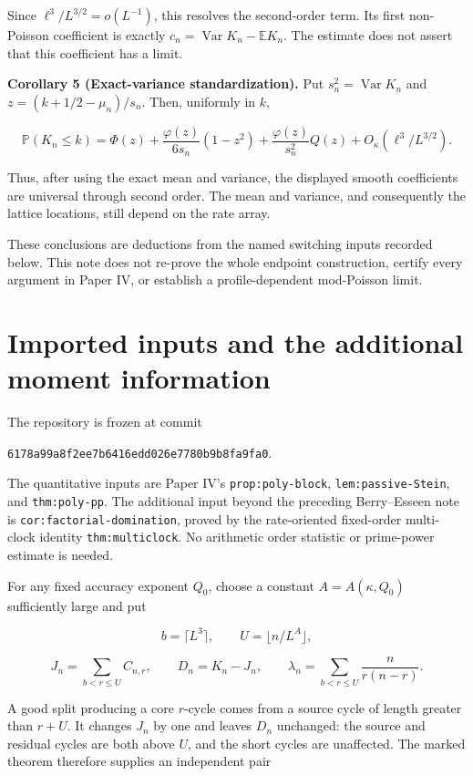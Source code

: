 \documentclass[
  11pt,
]{article}
\begin{document}
Since \(\ell^3/L^{3/2}=o(L^{-1})\), this resolves the second-order term.
Its first non-Poisson coefficient is exactly
\(c_n=\operatorname{Var}K_n-\mathbb E K_n\). The estimate does not
assert that this coefficient has a limit.


\textbf{Corollary 5 (Exact-variance standardization).} Put
\(s_n^2=\operatorname{Var}K_n\) and \(z=(k+1/2-\mu_n)/s_n\). Then,
uniformly in \(k\),

\[
\mathbb P(K_n\le k)
=\Phi(z)+\frac{\varphi(z)}{6s_n}(1-z^2)
+\frac{\varphi(z)}{s_n^2}Q(z)
+O_\kappa(\ell^3/L^{3/2}).
\tag{7}
\]

Thus, after using the exact mean and variance, the displayed smooth
coefficients are universal through second order. The mean and variance,
and consequently the lattice locations, still depend on the rate array.

These conclusions are deductions from the named switching inputs
recorded below. This note does not re-prove the whole endpoint
construction, certify every argument in Paper IV, or establish a
profile-dependent mod-Poisson limit.

\section{Imported inputs and the additional moment
information}\label{imported-inputs-and-the-additional-moment-information}

The repository is frozen at commit

\texttt{6178a99a8f2ee7b6416edd026e7780b9b8fa9fa0}.

The quantitative inputs are Paper IV's \texttt{prop:poly-block},
\texttt{lem:passive-Stein}, and \texttt{thm:poly-pp}. The additional
input beyond the preceding Berry--Esseen note is
\texttt{cor:factorial-domination}, proved by the rate-oriented
fixed-order multi-clock identity \texttt{thm:multiclock}. No arithmetic
order statistic or prime-power estimate is needed.

For any fixed accuracy exponent \(Q_0\), choose a constant
\(A=A(\kappa,Q_0)\) sufficiently large and put

\[
b=\lceil L^3\rceil,\qquad U=\lfloor n/L^A\rfloor,
\]

\[
J_n=\sum_{b<r\le U}C_{n,r},\qquad
D_n=K_n-J_n,\qquad
\lambda_n=\sum_{b<r\le U}\frac{n}{r(n-r)}.
\]

A good split producing a core \(r\)-cycle comes from a source cycle of
length greater than \(r+U\). It changes \(J_n\) by one and leaves
\(D_n\) unchanged: the source and residual cycles are both above \(U\),
and the short cycles are unaffected. The marked theorem therefore
supplies an independent pair
\end{document}
